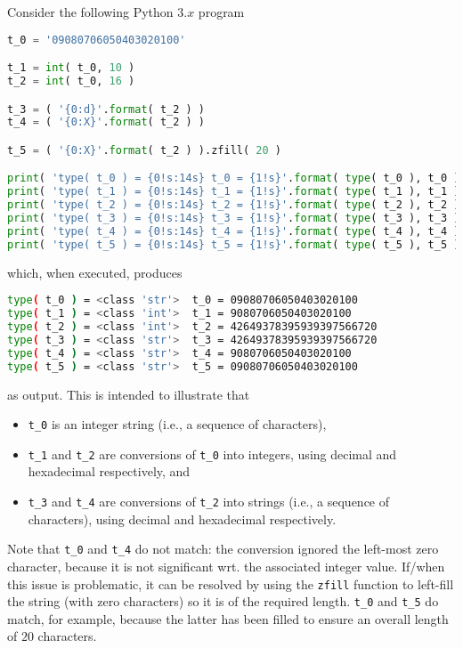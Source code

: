Consider the following Python $3.x$ program
 
\begin{lstlisting}[language={Python},frame={single},basicstyle={\ttfamily\small}]
t_0 = '09080706050403020100'

t_1 = int( t_0, 10 )
t_2 = int( t_0, 16 )

t_3 = ( '{0:d}'.format( t_2 ) )
t_4 = ( '{0:X}'.format( t_2 ) )

t_5 = ( '{0:X}'.format( t_2 ) ).zfill( 20 )

print( 'type( t_0 ) = {0!s:14s} t_0 = {1!s}'.format( type( t_0 ), t_0 ) )
print( 'type( t_1 ) = {0!s:14s} t_1 = {1!s}'.format( type( t_1 ), t_1 ) )
print( 'type( t_2 ) = {0!s:14s} t_2 = {1!s}'.format( type( t_2 ), t_2 ) )
print( 'type( t_3 ) = {0!s:14s} t_3 = {1!s}'.format( type( t_3 ), t_3 ) )
print( 'type( t_4 ) = {0!s:14s} t_4 = {1!s}'.format( type( t_4 ), t_4 ) )
print( 'type( t_5 ) = {0!s:14s} t_5 = {1!s}'.format( type( t_5 ), t_5 ) )
\end{lstlisting}
 
\noindent
which, when executed, produces

\begin{lstlisting}[language={bash},  frame={single},basicstyle={\ttfamily\small}] 
type( t_0 ) = <class 'str'>  t_0 = 09080706050403020100
type( t_1 ) = <class 'int'>  t_1 = 9080706050403020100
type( t_2 ) = <class 'int'>  t_2 = 42649378395939397566720
type( t_3 ) = <class 'str'>  t_3 = 42649378395939397566720
type( t_4 ) = <class 'str'>  t_4 = 9080706050403020100
type( t_5 ) = <class 'str'>  t_5 = 09080706050403020100
\end{lstlisting}

\noindent
as output.  This is intended to illustrate that
 
\begin{itemize}
\item \lstinline[language={Python}]|t_0| is an
      integer string
      (i.e., a sequence of characters),
\item \lstinline[language={Python}]|t_1| 
      and 
      \lstinline[language={Python}]|t_2|
      are conversions of 
      \lstinline[language={Python}]|t_0| 
      into
      integers,
      using decimal and hexadecimal respectively,
      and
\item \lstinline[language={Python}]|t_3| 
      and
      \lstinline[language={Python}]|t_4|
      are conversions of 
      \lstinline[language={Python}]|t_2| 
      into
      strings
      (i.e., a sequence of characters),
      using decimal and hexadecimal respectively.
\end{itemize}
 
\noindent
Note that 
\lstinline[language={Python}]|t_0| 
and 
\lstinline[language={Python}]|t_4| 
do not match: 
the conversion ignored the left-most zero character, because it is not
significant wrt. the associated integer value.  
If/when this issue is problematic, it can be resolved by using the
\lstinline[language={Python}]|zfill| 
function to left-fill the string (with zero characters) so it is of the 
required length.
\lstinline[language={Python}]|t_0| 
and
\lstinline[language={Python}]|t_5| 
do     match,
for example,
because the latter has been filled to ensure an overall length of $20$ 
characters.
